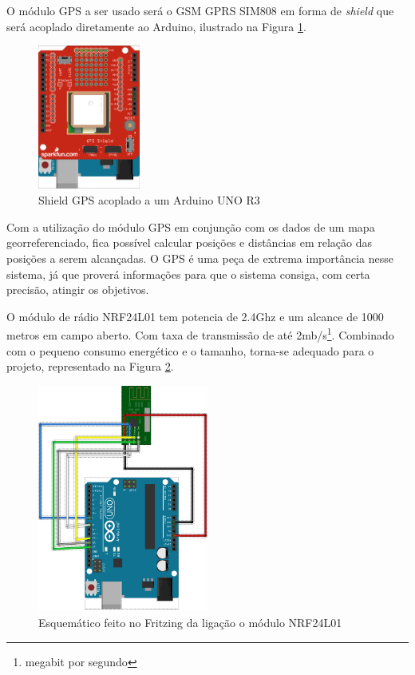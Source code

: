 O módulo GPS a ser usado será o GSM GPRS SIM808 em forma de\textit{ shield} que será acoplado diretamente ao Arduino, ilustrado na Figura \ref{fig:gps:vaa}.
\begin{figure}[H]
    \centering
    \includegraphics[width=0.3\textwidth]{figuras/ARDUINOGPS.png}
    \caption{Shield GPS acoplado a um Arduino UNO R3}
    \label{fig:gps:vaa}
\end{figure}

Com a utilização do módulo GPS em conjunção com os dados de um mapa georreferenciado, fica possível calcular posições e distâncias em relação das posições a serem alcançadas. O GPS é uma peça de extrema importância nesse sistema, já que proverá informações para que o sistema consiga, com certa precisão, atingir os objetivos.

O módulo de rádio NRF24L01 tem potencia de 2.4Ghz e um alcance de 1000 metros em campo aberto. Com taxa de transmissão de até 2mb/s\footnote{megabit por segundo}. Combinado com o pequeno consumo energético e o tamanho, torna-se adequado para o projeto, representado na Figura \ref{fig:fritz:radio}.
\begin{figure}[H]
    \centering
    \includegraphics[width=0.5\textwidth]{figuras/RADIO.png}
    \caption{Esquemático feito no Fritzing da ligação o módulo NRF24L01}
    \label{fig:fritz:radio}
\end{figure}

